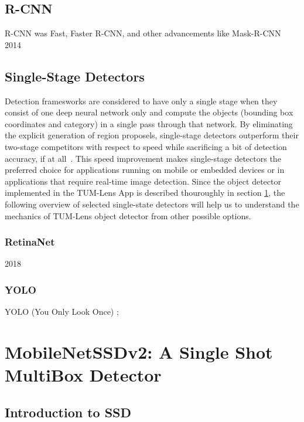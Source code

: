 \documentclass[
			   fontsize=11pt,
               paper=a4,
               bibliography=totoc,
               idxtotoc,
               headsepline,
               footsepline,
               footinclude=false,
               BCOR=12mm,
               DIV=13,
               openany,   %
               ]
               {scrbook}
\begin{document}
\subsection{R-CNN}

R-CNN was 
Fast, Faster R-CNN, and other advancements like Mask-R-CNN
2014 \cite{rcnnIntro}

\subsection{Single-Stage Detectors}

Detection framesworks are considered to have only a single stage when they consist of one deep neural network only and compute the objects (bounding box coordinates and category) in a single pass through that network. By eliminating the explicit generation of region proposels, single-stage detectors outperform their two-stage competitors with respect to speed while sacrificing a bit of detection accuracy, if at all~\cite{detectorSSD}. %
This speed improvement makes single-stage detectors the preferred choice for applications running on mobile or embedded devices or in applications that require real-time image detection. Since the object detector implemented in the TUM-Lens App is described thouroughly in section \ref{sec:mobilessd}, the following overview of selected single-state detectors will help us to understand the mechanics of TUM-Lens object detector from other possible options.

\subsubsection{RetinaNet}

2018

\subsubsection{YOLO}

YOLO (You Only Look Once) ; \cite{detectorYOLOv4}



\section{MobileNetSSDv2: A Single Shot MultiBox Detector} \label{sec:mobilessd}

\subsection{Introduction to SSD}
\end{document}

